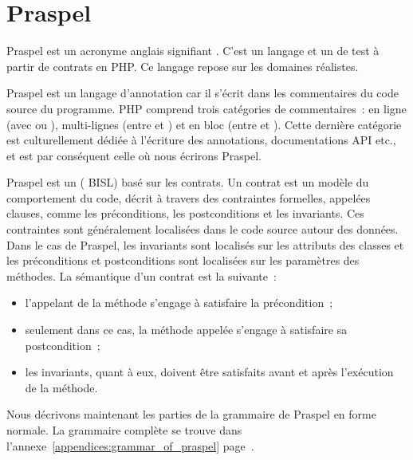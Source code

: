 \def\gsep{$\quad::=\quad$}
\def\mvert{$\;\;|\;\;$}
\def\mvertp{\phantom{$\;\;|\;\;$}}
\newcommand{\gtoken}[1]{\underline{\code{php-#1}}}
\newcommand{\grule}[1]{\textit{#1}}

\section{Praspel}
\label{section:language:praspel}

Praspel est un acronyme anglais signifiant . C'est un langage et un  de
test à partir de contrats en PHP. Ce langage repose sur les domaines réalistes.

Praspel est un {\strong langage d'annotation} car il s'écrit dans les
commentaires du code source du programme. PHP comprend trois catégories de
commentaires~: en ligne (avec \code{//} ou \code{\#}), multi-lignes (entre
\code{/*} et \code{*/}) et en bloc (entre \code{/**} et \code{*/}). Cette
dernière catégorie est culturellement dédiée à l'écriture des annotations,
documentations API etc., et est par conséquent celle où nous écrirons Praspel.

Praspel est un  ({\strong
BISL}) basé sur les contrats. Un {\strong contrat} est un modèle du comportement
du code, décrit à travers des contraintes formelles, appelées {\strong clauses},
comme les préconditions, les postconditions et les invariants. Ces contraintes
sont généralement localisées dans le code source autour des données.  Dans le
cas de Praspel, les invariants sont localisés sur les attributs des classes et
les préconditions et postconditions sont localisées sur les paramètres des
méthodes. La sémantique d'un contrat est la suivante~:

\begin{itemize}

\item l'appelant de la méthode s'engage à satisfaire la précondition~;

\item seulement dans ce cas, la méthode appelée s'engage à satisfaire sa
postcondition~;

\item les invariants, quant à eux, doivent être satisfaits avant et après
l'exécution de la méthode.

\end{itemize}

Nous décrivons maintenant les parties de la grammaire de Praspel en forme
normale. La grammaire complète se trouve dans
l'annexe~\ref{appendices:grammar_of_praspel}
page~\pageref{appendices:grammar_of_praspel}.

